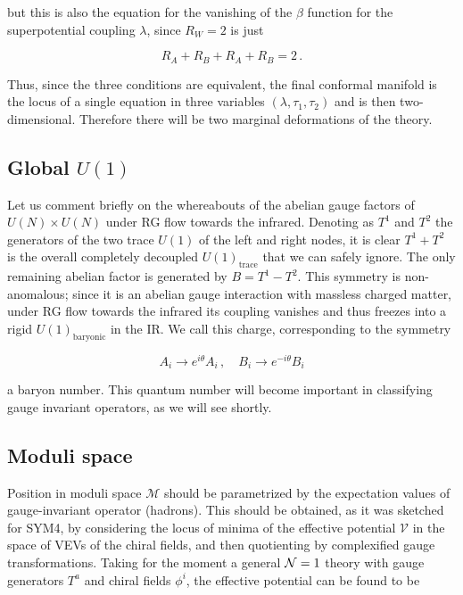 but this is also the equation for the vanishing of the $\beta$ function for the superpotential coupling $\lambda$, since $R_W = 2$ is just

\begin{equation}
	R_A + R_B + R_A + R_B = 2\,.
	\label{}
\end{equation}

Thus, since the three conditions are equivalent, the final conformal manifold is the locus of a single equation in three variables $(\lambda,\tau_1,\tau_2)$ and is then two-dimensional. Therefore there will be two marginal deformations of the theory.

\subsection{Global $U(1)$} \label{sec:kwuone}

Let us comment briefly on the whereabouts of the abelian gauge factors of $U(N) \times U(N)$ under RG flow towards the infrared. Denoting as $T^1$ and $T^2$ the generators of the two trace $U(1)$ of the left and right nodes, it is clear $T^1+T^2$ is the overall completely decoupled $U(1)_\text{trace}$ that we can safely ignore. The only remaining abelian factor is generated by $B = T^1 - T^2$. This symmetry is non-anomalous; since it is an abelian gauge interaction with massless charged matter, under RG flow towards the infrared its coupling vanishes and thus freezes into a rigid $U(1)_\text{baryonic}$ in the IR. We call this charge, corresponding to the symmetry

\begin{equation}
	A_i \rightarrow e^{i\theta} A_i\,,\quad B_i \rightarrow e^{-i\theta} B_i
	\label{}
\end{equation}

a baryon number. This quantum number will become important in classifying gauge invariant operators, as we will see shortly.

\subsection{Moduli space}

Position in moduli space $\mathcal{M}$ should be parametrized by the expectation values of gauge-invariant operator (hadrons). This should be obtained, as it was sketched for SYM4, by considering the locus of minima of the effective potential $\mathcal{V}$ in the space of VEVs of the chiral fields, and then quotienting by complexified gauge transformations. Taking for the moment a general $\mathcal{N}=1$ theory with gauge generators $T^a$ and chiral fields $\phi^i$, the effective potential can be found to be

